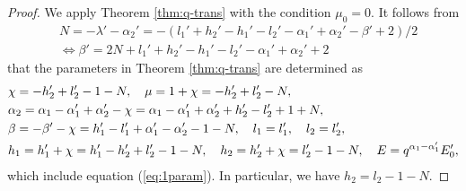 \documentclass[12pt]{amsart}
\numberwithin{equation}{section}
\theoremstyle{definition}
\theoremstyle{remark}
\begin{document}
\begin{proof}
We apply Theorem \ref{thm:q-trans} with the condition $\mu _0=0$.
It follows from
  \begin{align*}
    &N = -\lambda ' - \alpha_{2}' = -(l_{1}' + h_{2}' - h_{1}' - l_{2}' - \alpha_{1}' + \alpha_{2}' - \beta' + 2)/2 \\
    &\Leftrightarrow \beta' = 2N + l_{1}' + h_{2}' - h_{1}' - l_{2}' - \alpha_{1}' + \alpha_{2}' + 2
  \end{align*}
that the parameters in Theorem \ref{thm:q-trans} are determined as
  \begin{align}
    & \chi = -h_{2}' + l_{2}' - 1 - N, \quad \mu = 1 + \chi = -h_{2}' + l_{2}' - N, \label{eq:1parampf} \\
    &  \alpha_{2} = \alpha_{1} - \alpha_{1}' + \alpha_{2}' - \chi = \alpha_{1} - \alpha_{1}' + \alpha_{2}' + h_{2}' - l_{2}' + 1 + N , \notag \\
    & \beta = -\beta' - \chi = h_{1}' - l_{1}' + \alpha_{1}' - \alpha_{2}' - 1 - N, \quad l_{1} = l_{1}',  \quad  l_{2} = l_{2}', \notag \\
    & h_{1} = h_{1}' + \chi = h_{1}' -h_{2}' + l_{2}' - 1 - N, \quad h_{2} = h_{2}' + \chi = l_{2}' - 1 - N, \quad E = q^{\alpha_{1} - \alpha_{1}'}E_{0}' , \notag
  \end{align}
which include equation (\ref{eq:1param}).
In particular, we have $h_{2} = l_{2} - 1 - N$.


\end{proof}
\end{document}
